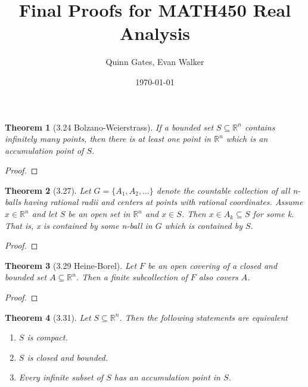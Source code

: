 \documentclass[aps,pra,notitlepage,amsmath,amssymb,letterpaper,12pt]{revtex4-1}
\newtheorem{theorem}{Theorem}
\begin{document}
\title{Final Proofs for MATH450 Real Analysis}
\author{Quinn Gates, Evan Walker}
\date{\today}

\maketitle


\begin{theorem}[3.24 Bolzano-Weierstrass]
If a bounded set $S \subseteq \mathbb{R}^n$ contains infinitely many points, then there is at least one point in $\mathbb{R}^n$ which is an accumulation point of $S$.
\end{theorem}

\begin{proof}
\end{proof}


\begin{theorem}[3.27] \nonumber
Let $G = \{A_{1},A_{2},...\}$ denote the countable collection of all n-balls having rational radii and centers at points with rational coordinates. Assume $x \in \mathbb{R}^n$ and let $S$ be an open set in $\mathbb{R}^n$ and $x \in S$. Then $x \in A_{k} \subseteq S$ for some k. That is, x is contained by some n-ball in $G$ which is contained by $S$.
\end{theorem}

\begin{proof}
\end{proof}


\begin{theorem}[3.29 Heine-Borel]
Let $F$ be an open covering of a closed and bounded set $A \subseteq \mathbb{R}^n$. Then a finite subcollection of $F$ also covers $A$.
\end{theorem}

\begin{proof}
\end{proof}


\begin{theorem}[3.31]
Let $S \subseteq \mathbb{R}^n$. Then the following statements are equivalent
\begin{enumerate}[\upshape a)]
  \item $S$ is compact. %
  \item $S$ is closed and bounded.
  \item Every infinite subset of $S$ has an accumulation point in $S$.
\end{enumerate}
\end{theorem}
\end{document}
